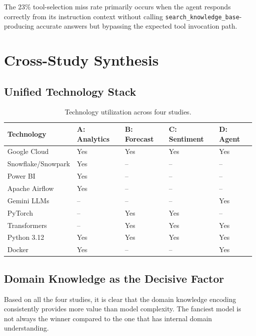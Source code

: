 \documentclass[11pt,a4paper]{article}
\begin{document}
The 23\% tool-selection miss rate primarily occurs when the agent responds correctly from its instruction context without calling \texttt{search\_knowledge\_base}-producing accurate answers but bypassing the expected tool invocation path.

\section{Cross-Study Synthesis}

\subsection{Unified Technology Stack}

\begin{table}[H]
\caption{Technology utilization across four studies.}
\setlength{\tabcolsep}{10pt}
\renewcommand{\arraystretch}{1.4}
\begin{tabular}{l l l l l}
\toprule
\textbf{Technology} & \textbf{A: Analytics} & \textbf{B: Forecast} & \textbf{C: Sentiment} & \textbf{D: Agent} \\
\midrule
Google Cloud & Yes & Yes & Yes & Yes \\
Snowflake/Snowpark & Yes & -- & -- & -- \\
Power BI & Yes & -- & -- & -- \\
Apache Airflow & Yes & -- & -- & -- \\
Gemini LLMs & -- & -- & -- & Yes \\
PyTorch & -- & Yes & Yes & -- \\
Transformers & -- & Yes & Yes & Yes \\
Python 3.12 & Yes & Yes & Yes & Yes \\
Docker & Yes & -- & -- & Yes \\
\bottomrule
\end{tabular}
\end{table}

\subsection{Domain Knowledge as the Decisive Factor}

Based on all the four studies, it is clear that the domain knowledge encoding consistently provides more value than model complexity. The fanciest model is not always the winner compared to the one that has internal domain understanding.
\end{document}
